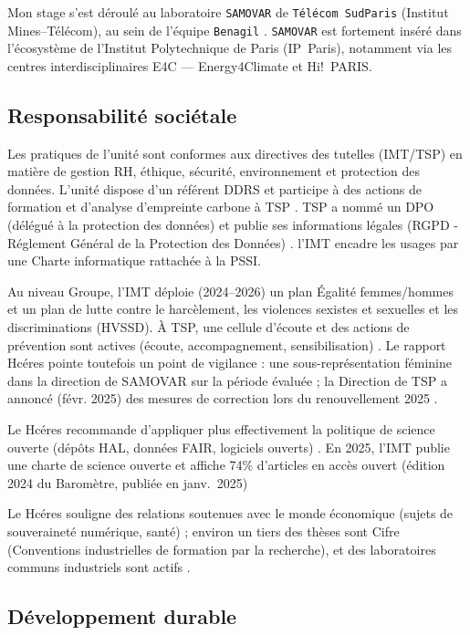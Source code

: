 


Mon stage s’est déroulé au laboratoire \verb!SAMOVAR! de \verb!Télécom SudParis! (Institut Mines–Télécom), au sein de l’équipe \verb!Benagil! \cite{benagil}.
\verb!SAMOVAR! est fortement inséré dans l’écosystème de l’Institut Polytechnique de Paris (IP~Paris), notamment via les centres interdisciplinaires E4C — Energy4Climate et Hi!~PARIS.

\subsection{Responsabilité sociétale}
Les pratiques de l’unité sont conformes aux directives des tutelles (IMT/TSP) en matière de gestion RH, éthique, sécurité, environnement et protection des données. 
L’unité dispose d’un référent DDRS et participe à des actions de formation et d’analyse d’empreinte carbone à TSP \cite{hceres}. 
TSP a nommé un DPO (délégué à la protection des données) et publie ses informations légales (RGPD - Réglement Général de la Protection des Données) \cite{legal}. l’IMT encadre les usages par une Charte informatique rattachée à la PSSI.

Au niveau Groupe, l’IMT déploie (2024–2026) un plan Égalité femmes/hommes et un plan de lutte contre le harcèlement, les violences sexistes et sexuelles et les discriminations (HVSSD)\cite{hf}.
À TSP, une cellule d’écoute et des actions de prévention sont actives (écoute, accompagnement, sensibilisation) \cite{prev}.
Le rapport Hcéres pointe toutefois un point de vigilance : une sous-représentation féminine dans la direction de SAMOVAR sur la période évaluée ; 
la Direction de TSP a annoncé (févr. 2025) des mesures de correction lors du renouvellement 2025 \cite{hceres}.

Le Hcéres recommande d’appliquer plus effectivement la politique de science ouverte (dépôts HAL, données FAIR, logiciels ouverts) \cite{hceres}.
En 2025, l’IMT publie une charte de science ouverte et affiche 74\% d’articles en accès ouvert (édition 2024 du Baromètre, publiée en janv.~2025)

Le Hcéres souligne des relations soutenues avec le monde économique (sujets de souveraineté numérique, santé) ; environ un tiers des thèses sont Cifre (Conventions industrielles de formation par la recherche), 
et des laboratoires communs industriels sont actifs \cite{hceres}.

\subsection*{Développement durable}

